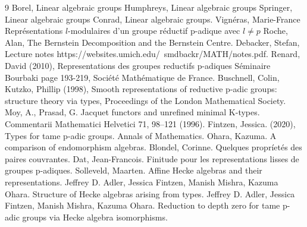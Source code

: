 \documentclass[10pt]{article}
\numberwithin{equation}{theorem}
\begin{document}
\begin{thebibliography}{9}
 Borel, Linear algebraic groups
 Humphreys, Linear algebraic groups
 Springer, Linear algebraic groups
 Conrad, Linear algebraic groups.
 Vignéras, Marie-France Représentations $l$-modulaires d'un groupe réductif p-adique avec $l\not=p$
Roche, Alan, The Bernstein Decomposition and the Bernstein Centre.
 Debacker, Stefan, Lecture notes https://websites.umich.edu/~smdbackr/MATH/notes.pdf.
 Renard, David (2010), Representations des groupes reductifs p-adiques Séminaire Bourbaki page 193-219, Société Mathématique de France.
 Buschnell, Colin, Kutzko, Phillip (1998),  Smooth representations of reductive p-adic groups: structure theory via types, Proceedings of the London Mathematical Society.
 Moy, A., Prasad, G. Jacquet functors and unrefined minimal K-types. Commentarii Mathematici Helvetici 71, 98–121 (1996).
 Fintzen, Jessica. (2020), Types for tame p-adic groups. Annals of Mathematics.
 Ohara, Kazuma. A comparison of endomorphism algebras.
 Blondel, Corinne. Quelques propríetés des paires couvrantes.
 Dat, Jean-Francois. Finitude pour les representations lisses de groupes p-adiques.
 Solleveld, Maarten. Affine Hecke algebras and their representations.
 Jeffrey D. Adler, Jessica Fintzen, Manish Mishra, Kazuma Ohara. Structure of Hecke algebras arising from types.
 Jeffrey D. Adler, Jessica Fintzen, Manish Mishra, Kazuma Ohara. Reduction to depth zero for tame p-adic groups via Hecke algebra isomorphisms.
\end{thebibliography}
\end{document}
